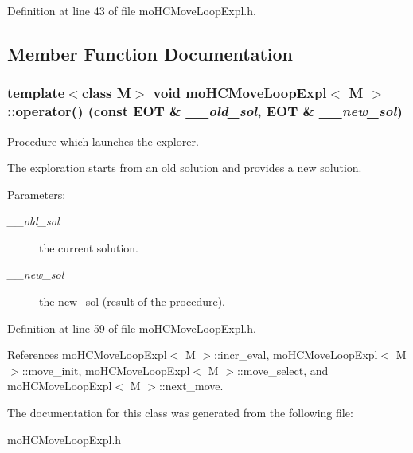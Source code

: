 Definition at line 43 of file mo\-HCMove\-Loop\-Expl.h.

\subsection{Member Function Documentation}
\subsubsection{\setlength{\rightskip}{0pt plus 5cm}template$<$class M$>$ void {\bf mo\-HCMove\-Loop\-Expl}$<$ M $>$::operator() (const {\bf EOT} \& {\em \_\-\_\-old\_\-sol}, {\bf EOT} \& {\em \_\-\_\-new\_\-sol})\hspace{0.3cm}{\tt  [inline]}}\label{classmo_h_c_move_loop_expl_f48d5379caac7f6a165e9fe8840e6ccb}


Procedure which launches the explorer. 

The exploration starts from an old solution and provides a new solution.

\begin{Desc}
\item[Parameters:]
\begin{description}
\item[{\em \_\-\_\-old\_\-sol}]the current solution. \item[{\em \_\-\_\-new\_\-sol}]the new\_\-sol (result of the procedure). \end{description}
\end{Desc}


Definition at line 59 of file mo\-HCMove\-Loop\-Expl.h.

References mo\-HCMove\-Loop\-Expl$<$ M $>$::incr\_\-eval, mo\-HCMove\-Loop\-Expl$<$ M $>$::move\_\-init, mo\-HCMove\-Loop\-Expl$<$ M $>$::move\_\-select, and mo\-HCMove\-Loop\-Expl$<$ M $>$::next\_\-move.

The documentation for this class was generated from the following file:\begin{CompactItemize}
\item 
mo\-HCMove\-Loop\-Expl.h\end{CompactItemize}
